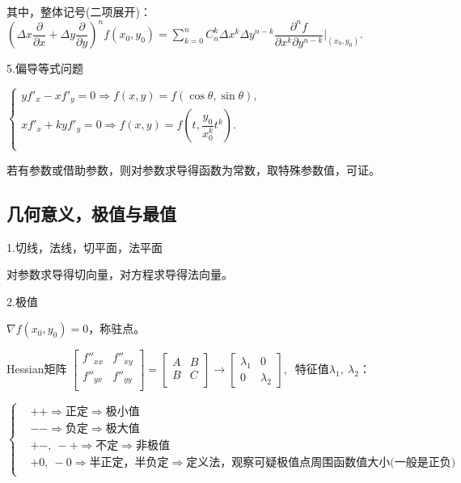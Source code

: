 \documentclass[UTF8]{ctexart}
\newcommand\no{\noindent}
\newcommand\dis{\displaystyle}
\newcommand\sumkn{\dis\sum\limits_{k=0}^n}
\begin{document}
\begin{spacing}{2}
其中，整体记号(二项展开)：
$\left(\Delta x\dfrac{\partial}{\partial x}
+\Delta y\dfrac{\partial}{\partial y}\right)^nf(x_0,y_0)
=\sumkn C_n^k\Delta x^k\Delta y^{n-k}\dfrac{\partial^nf}{\partial x^k\partial y^{n-k}}
\Bigg|_{(x_0,y_0)}.$

\no5.偏导等式问题

\vspace{0.3cm}

$\left\{\begin{aligned}
yf'_x-xf'_y=0\Longrightarrow f(x,y)=f(\cos\theta,\sin\theta),\\
xf'_x+kyf'_y=0\Longrightarrow f(x,y)=f\left(t,\dfrac{y_0}{x_0^k}t^k\right).\\
\end{aligned}\right.$

\vspace{0.3cm}

若有参数或借助参数，则对参数求导得函数为常数，取特殊参数值，可证。

\subsection{几何意义，极值与最值}

\no1.切线，法线，切平面，法平面

对参数求导得切向量，对方程求导得法向量。

\no2.极值

$\nabla f(x_0,y_0)=0$，称驻点。

Hessian矩阵
$\left[          
  \begin{array}{cc}   
    f''_{xx} & f''_{xy} \\  
    f''_{yx} &f''_{yy} \\  
  \end{array}
\right]     
=
\left[          
  \begin{array}{cc}   
    A &B \\  
    B &C \\  
  \end{array}
\right]     
\longrightarrow
\left[          
  \begin{array}{cc}  
\lambda_1&0\\
0&\lambda_2
\end{array}
\right]  
,\ $
特征值$\lambda_1,\ \lambda_2$：

$\left\{\begin{aligned}
&++\Longrightarrow\text{正定}\Longrightarrow\text{极小值}\\
&--\Longrightarrow\text{负定}\Longrightarrow\text{极大值}\\
&+-,\ -+\Longrightarrow\text{不定}\Longrightarrow\text{非极值}\\
&+0,\ -0\Longrightarrow\text{半正定，半负定}\Longrightarrow
\text{定义法，观察可疑极值点周围函数值大小(一般是正负)}\\
\end{aligned}\right.$


\end{spacing}
\end{document}
